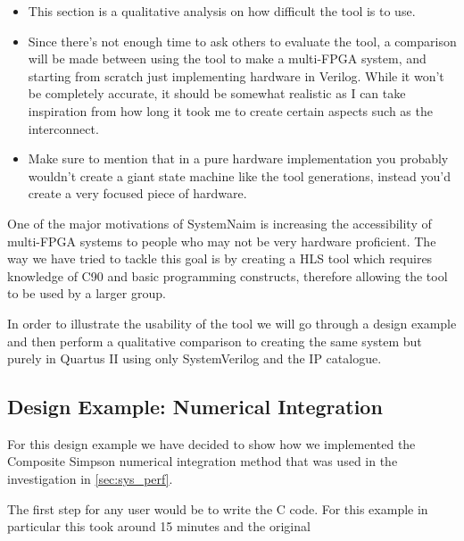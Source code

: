 \begin{itemize}
    \item This section is a qualitative analysis on how difficult the tool is to use. 
    \item Since there's not enough time to ask others to evaluate the tool, a comparison will be made between using the tool to make a multi-FPGA system, and starting from scratch just implementing hardware in Verilog. While it won't be completely accurate, it should be somewhat realistic as I can take inspiration from how long it took me to create certain aspects such as the interconnect.
    \item Make sure to mention that in a pure hardware implementation you probably wouldn't create a giant state machine like the tool generations, instead you'd create a very focused piece of hardware.
\end{itemize}

One of the major motivations of SystemNaim is increasing the accessibility of multi-FPGA systems to people who may not be very hardware proficient. The way we have tried to tackle this goal is by creating a HLS tool which requires knowledge of C90 and basic programming constructs, therefore allowing the tool to be used by a larger group. 

In order to illustrate the usability of the tool we will go through a design example and then perform a qualitative comparison to creating the same system but purely in Quartus II using only SystemVerilog and the IP catalogue.

\subsection{Design Example: Numerical Integration}

For this design example we have decided to show how we implemented the Composite Simpson numerical integration method that was used in the investigation in \autoref{sec:sys_perf}.

The first step for any user would be to write the C code. For this example in particular this took around 15 minutes and the original 
